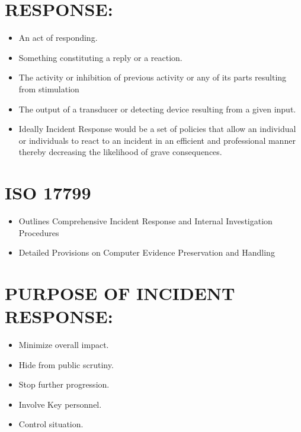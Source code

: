 \documentclass[10pt,british,english]{article}
\begin{document}
\section{RESPONSE: }
\begin{itemize}
\item An act of responding.
\item Something constituting a reply or a reaction.
\item The activity or inhibition of previous activity or any of its parts
resulting from stimulation
\item The output of a transducer or detecting device resulting from a given
input.
\item Ideally Incident Response would be a set of policies that allow an
individual or individuals to react to an incident in an efficient
and professional manner thereby decreasing the likelihood of grave
consequences.
\end{itemize}

\section{ISO 17799 }
\begin{itemize}
\item Outlines Comprehensive Incident Response and Internal Investigation
Procedures
\item Detailed Provisions on Computer Evidence Preservation and Handling 
\end{itemize}

\section{PURPOSE OF INCIDENT RESPONSE:}
\begin{itemize}
\item Minimize overall impact.
\item Hide from public scrutiny.
\item Stop further progression.
\item Involve Key personnel.
\item Control situation.
\end{itemize}
%
\end{document}

